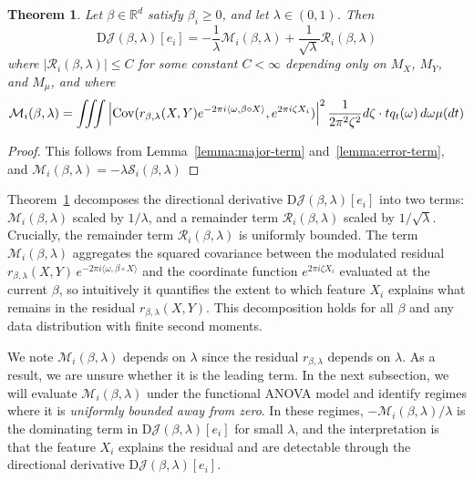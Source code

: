 \documentclass[sn-mathphys-num]{sn-jnl}%
\numberwithin{equation}{section}
\newcommand{\R}{\mathbb{R}}
\newcommand{\Cov}{{\rm Cov}}
\theoremstyle{thmstyleone}%
\newtheorem{theorem}{Theorem}%
\theoremstyle{thmstyletwo}%
\theoremstyle{thmstylethree}%
\begin{document}
\vspace{.5em}
\begin{theorem}
\label{theorem:gradient-expression}
Let $\beta \in \R^d$ satisfy $\beta_i \ge 0$, and let $\lambda \in (0, 1)$. Then
\begin{equation*}
	\mathrm{D}\mathcal{J}(\beta, \lambda)[e_i] = - \frac{1}{\lambda} \mathcal{M}_i(\beta, \lambda) + \frac{1}{\sqrt{\lambda}}\mathcal{R}_i(\beta, \lambda)
\end{equation*}
where $|\mathcal{R}_i(\beta, \lambda)| \le C$ 
for some constant $C  < \infty$ depending only on $M_X$, $M_Y$, and $M_\mu$, and where 
\begin{equation*}
	 \mathcal{M}_i(\beta, \lambda) = \iiint \left|\Cov(r_{\beta, \lambda} (X, Y) e^{-2\pi i \langle \omega, \beta\circ X \rangle},  e^{2\pi i \zeta X_i}) \right|^2 \frac{1}{2\pi^2 \zeta^2} d\zeta \cdot t q_t(\omega) \, d\omega  \mu(dt)
\end{equation*} 
\end{theorem} 

\begin{proof}%
This follows from Lemma~\ref{lemma:major-term} and~\ref{lemma:error-term}, and $ \mathcal{M}_i(\beta, \lambda) = -\lambda \mathcal{S}_i(\beta, \lambda)$
\end{proof} 

Theorem~\ref{theorem:gradient-expression} decomposes the directional derivative $\mathrm{D}\mathcal{J}(\beta, \lambda)[e_i]$ into two terms: $\mathcal{M}_i(\beta, \lambda)$ scaled by $1/\lambda$, and a remainder term $\mathcal{R}_i(\beta, \lambda)$ scaled by $1/\sqrt{\lambda}$. Crucially, the remainder term $\mathcal{R}_i(\beta, \lambda)$  is uniformly bounded.
The term  $\mathcal{M}_i(\beta, \lambda)$ aggregates the squared covariance between the modulated residual 
$r_{\beta, \lambda}(X, Y)\, e^{-2\pi i \langle \omega, \beta\circ X \rangle}$  and the coordinate function $e^{2\pi i \zeta X_i}$ evaluated at the current $\beta$, so intuitively it quantifies the extent to which feature $X_i$ explains what remains in the residual $r_{\beta, \lambda}(X, Y)$. This decomposition holds for all $\beta$ and any data distribution with finite second moments.
 
We note $\mathcal{M}_i(\beta, \lambda)$ depends on $\lambda$ since the residual $r_{\beta, \lambda}$ depends on $\lambda$. 
As a result, we are unsure whether it is the leading term. 
In the next subsection, we will evaluate $\mathcal{M}_i(\beta, \lambda)$ under the functional ANOVA model and identify regimes where it is \emph{uniformly bounded away from zero}. In these regimes, $-\mathcal{M}_i(\beta, \lambda)/\lambda$ is the dominating term in $\mathrm{D}\mathcal{J}(\beta, \lambda)[e_i]$ for small $\lambda$, and the interpretation is that the feature $X_i$ explains the residual and are detectable through the directional derivative $\mathrm{D}\mathcal{J}(\beta, \lambda)[e_i]$.
\end{document}

